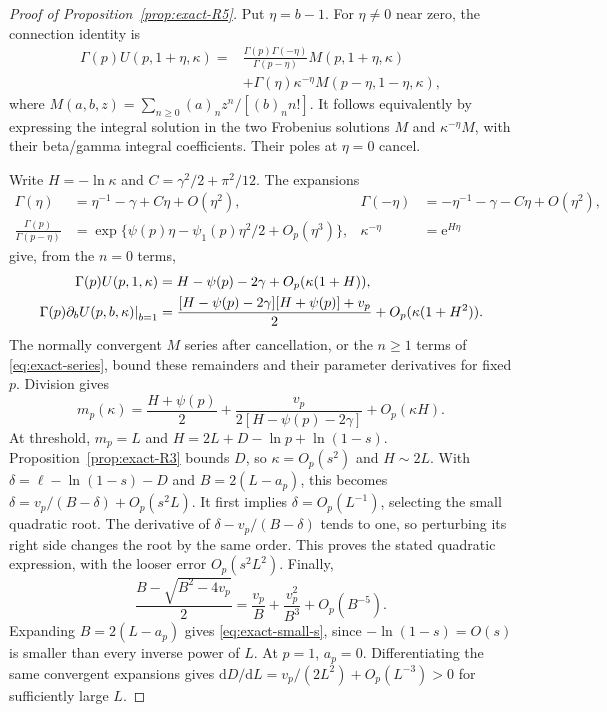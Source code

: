 \begin{proof}[Proof of Proposition~\ref{prop:exact-R5}]
Put $\eta=b-1$. For $\eta\ne0$ near zero, the connection identity is
\begin{equation}
 \begin{split}
 \Gamma(p)U(p,1+\eta,\kappa)
 ={}&\frac{\Gamma(p)\Gamma(-\eta)}{\Gamma(p-\eta)}
 M(p,1+\eta,\kappa)\\
 &+\Gamma(\eta)\kappa^{-\eta}M(p-\eta,1-\eta,\kappa),
 \end{split}\label{eq:exact-connection}
\end{equation}
where $M(a,b,z)=\sum_{n\geq0}(a)_nz^n/[(b)_nn!]$. It follows equivalently by expressing the integral solution in the two Frobenius solutions $M$ and $\kappa^{-\eta}M$, with their beta/gamma integral coefficients. Their poles at $\eta=0$ cancel.

Write $H=-\ln\kappa$ and $C=\gamma^2/2+\pi^2/12$. The expansions
\begin{align*}
 \Gamma(\eta)&=\eta^{-1}-\gamma+C\eta+O(\eta^2),&
 \Gamma(-\eta)&=-\eta^{-1}-\gamma-C\eta+O(\eta^2),\\
 \frac{\Gamma(p)}{\Gamma(p-\eta)}
 &=\exp\{\psi(p)\eta-\psi_1(p)\eta^2/2+O_p(\eta^3)\},&
 \kappa^{-\eta}&=\mathrm{e}^{H\eta}
\end{align*}
give, from the $n=0$ terms,
\begin{align}
 \Gamma(p)U(p,1,\kappa)&=H-\psi(p)-2\gamma+O_p(\kappa(1+H)),\notag\\
 \left.\Gamma(p)\partial_bU(p,b,\kappa)\right|_{b=1}
 &=\frac{[H-\psi(p)-2\gamma][H+\psi(p)]+v_p}{2}
   +O_p(\kappa(1+H^2)).
 \label{eq:exact-small-k-U}
\end{align}
The normally convergent $M$ series after cancellation, or the $n\geq1$ terms of \eqref{eq:exact-series}, bound these remainders and their parameter derivatives for fixed $p$. Division gives
\begin{equation}
 m_p(\kappa)=\frac{H+\psi(p)}2+
 \frac{v_p}{2[H-\psi(p)-2\gamma]}+O_p(\kappa H).
 \label{eq:exact-small-k-m}
\end{equation}
At threshold, $m_p=L$ and $H=2L+D-\ln p+\ln(1-s)$. Proposition~\ref{prop:exact-R3} bounds $D$, so $\kappa=O_p(s^2)$ and $H\sim2L$. With $\delta=\ell-\ln(1-s)-D$ and $B=2(L-a_p)$, this becomes $\delta=v_p/(B-\delta)+O_p(s^2L)$. It first implies $\delta=O_p(L^{-1})$, selecting the small quadratic root. The derivative of $\delta-v_p/(B-\delta)$ tends to one, so perturbing its right side changes the root by the same order. This proves the stated quadratic expression, with the looser error $O_p(s^2L^2)$. Finally,
\begin{equation}
 \frac{B-\sqrt{B^2-4v_p}}2
 =\frac{v_p}{B}+\frac{v_p^2}{B^3}+O_p(B^{-5}).
 \label{eq:exact-quadratic-expand}
\end{equation}
Expanding $B=2(L-a_p)$ gives \eqref{eq:exact-small-s}, since $-\ln(1-s)=O(s)$ is smaller than every inverse power of $L$. At $p=1$, $a_p=0$. Differentiating the same convergent expansions gives $\mathrm{d}D/\mathrm{d}L=v_p/(2L^2)+O_p(L^{-3})>0$ for sufficiently large $L$.


\end{proof}
